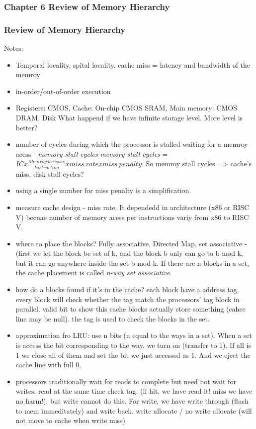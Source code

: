 \documentclass[8pt,UTF8]{article}
\begin{document}
    \subsubsection{Chapter 6 Review of Memory Hierarchy}
    \subsubsection{Review of Memory Hierarchy}
        Notes:
        \begin{itemize}
            \item Temporal locality, spital locality. cache miss = latency and bandwidth of the memroy
            \item in-order/out-of-order execution
            \item Registers: CMOS, Cache: On-chip CMOS SRAM, Main memory: CMOS DRAM, Disk What happend if we have infinite storage level. More level is better?
            \item number of cycles during which the processor is stalled waiting for a memroy acess - \emph{memory stall cycles} \emph{memory stall cycles} = $ICx\frac{Memroy accesses}{Instruction}xmiss\ rate x miss\ penalty$. So memroy stall cycles => cache's miss. disk stall cycles?
            \item using a single number for miss penalty is a simplification.
            \item measure cache design - miss rate. It dependedd in architecture (x86 or RISC V) becuae number of memory acess per instructions variy from x86 to RISC V.
            \item where to place the blocks? Fully associative, Directed Map, set associative - (first we let the block be set of k, and the block b only can go to b mod k, but it can go anywhere inside the set b mod k. If there are n blocks in a set, the cache placement is called \emph{n-way set associative}.
            \item how do a blocks found if it's in the cache? each block have a address tag, every block will check whether the tag match the processors' tag block in parallel. valid bit to show this cache blocks actually store something (cahce line may be null). the tag is used to check the blocks in the set. 
            \item approximation fro LRU: use n bits (n equal to the ways in a set). When a set is access the bit corresponding to the way, we turn on (transfer to 1). If all is 1 we close all of them and set the bit we just accessed as 1. And we eject the cache line with full 0.
            \item processors traditionally wait for reads to complete but need not wait for writes. read at the same time check tag. (if hit, we have read it! miss we have no harm!). but write cannot do this. For write, we have write through (flush to mem immeditately) and write back. write allocate / no write allocate (will not move to cache when write miss)
        \end{itemize}
\end{document}
